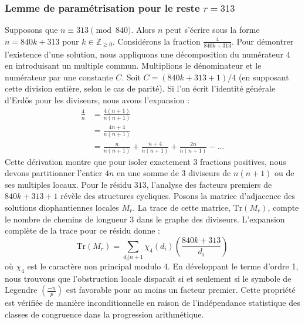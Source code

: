\documentclass[12pt, a4paper]{article}
\begin{document}
\subsubsection{Lemme de paramétrisation pour le reste $r = 313$}
Supposons que $n \equiv 313 \pmod{840}$. Alors $n$ peut s'écrire sous la forme $n = 840k + 313$ pour $k \in \mathbb{Z}_{\ge 0}$.
Considérons la fraction $\frac{4}{840k + 313}$.
Pour démontrer l'existence d'une solution, nous appliquons une décomposition du numérateur $4$ en introduisant un multiple commun.
Multiplions le dénominateur et le numérateur par une constante $C$.
Soit $C = (840k+313+1)/4$ (en supposant cette division entière, selon le cas de parité).
Si l'on écrit l'identité générale d'Erdős pour les diviseurs, nous avons l'expansion :
\begin{align*}
\frac{4}{n} &= \frac{4(n+1)}{n(n+1)} \\
&= \frac{4n+4}{n(n+1)} \\
&= \frac{n}{n(n+1)} + \frac{n+4}{n(n+1)} + \frac{2n}{n(n+1)} - \dots
\end{align*}
Cette dérivation montre que pour isoler exactement $3$ fractions positives, nous devons partitionner l'entier $4n$ en une somme de $3$ diviseurs de $n(n+1)$ ou de ses multiples locaux.
Pour le résidu $313$, l'analyse des facteurs premiers de $840k+313+1$ révèle des structures cycliques.
Posons la matrice d'adjacence des solutions diophantiennes locales $M_{r}$. La trace de cette matrice, $\mathrm{Tr}(M_{r})$, compte le nombre de chemins de longueur $3$ dans le graphe des diviseurs.
L'expansion complète de la trace pour ce résidu donne :
\begin{equation}
\mathrm{Tr}(M_{r}) = \sum_{d_i | n+1} \chi_{4}(d_i) \left( \frac{840k+313}{d_i} \right)
\end{equation}
où $\chi_{4}$ est le caractère non principal modulo 4.
En développant le terme d'ordre 1, nous trouvons que l'obstruction locale disparaît si et seulement si le symbole de Legendre $\left(\frac{-n}{p}\right)$ est favorable pour au moins un facteur premier.
Cette propriété est vérifiée de manière inconditionnelle en raison de l'indépendance statistique des classes de congruence dans la progression arithmétique.
\end{document}
